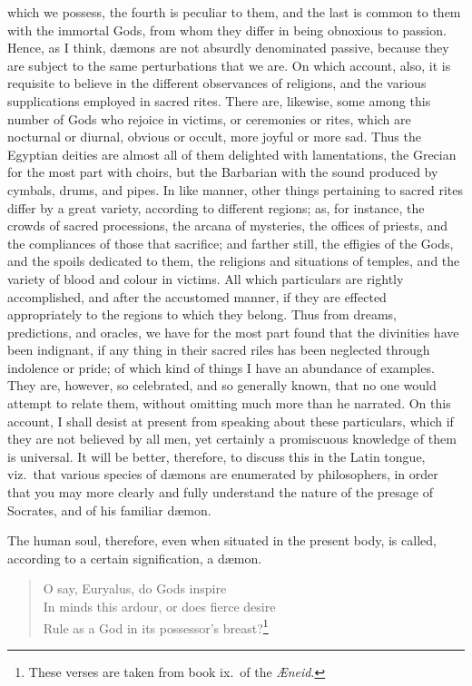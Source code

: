 \documentclass{article}
\begin{document}
which we possess, the fourth is peculiar to them, and the last is common to
them with the immortal Gods, from whom they differ in being obnoxious to
passion. Hence, as I think, d{\ae}mons are not absurdly denominated passive,
because they are subject to the same perturbations that we are. On which
account, also, it is requisite to believe in the different observances of
religions, and the various supplications employed in sacred rites. There are,
likewise, some among this number of Gods who rejoice in victims, or ceremonies
or rites, which are nocturnal or diurnal, obvious or occult, more joyful or
more sad. Thus the Egyptian deities are almost all of them delighted with
lamentations, the Grecian for the most part with choirs, but the Barbarian with
the sound produced by cymbals, drums, and pipes. In like manner, other things
pertaining to sacred rites differ by a great variety, according to different
regions; as, for instance, the crowds of sacred processions, the arcana of
mysteries, the offices of priests, and the compliances of those that sacrifice;
and farther still, the effigies of the Gods, and the spoils dedicated to them,
the religions and situations of temples, and the variety of blood and colour in
victims. All which particulars are rightly accomplished, and after the
accustomed manner, if they are effected appropriately to the regions to which
they belong. Thus from dreams, predictions, and oracles, we have for the most
part found that the divinities have been indignant, if any thing in their
sacred riles has been neglected through indolence or pride; of which kind of
things I have an abundance of examples. They are, however, so celebrated, and
so generally known, that no one would attempt to relate them, without omitting
much more than he narrated.  On this account, I shall desist at present from
speaking about these particulars, which if they are not believed by all men,
yet certainly a promiscuous knowledge of them is universal. It will be better,
therefore, to discuss this in the Latin tongue, viz.~that various species of
d{\ae}mons are enumerated by philosophers, in order that you may more clearly
and fully understand the nature of the presage of Socrates, and of his familiar
d{\ae}mon.

The human soul, therefore, even when situated in the present body, is called,
according to a certain signification, a d{\ae}mon.

\begin{verse} O say, Euryalus, do Gods inspire\\ In minds this ardour, or does
fierce desire\\ Rule as a God in its possessor's breast?\footnote{These verses
are taken from book ix.~of the \textit{{\AE}neid}.} \end{verse}
\end{document}
